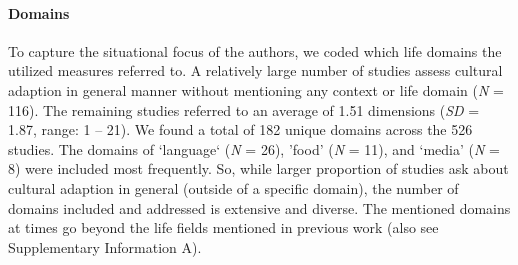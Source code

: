 \paragraph{Domains}

To capture the situational focus of the authors, we coded which life
domains the utilized measures referred to. A relatively large number of
studies assess cultural adaption in general manner without mentioning
any context or life domain (\textit{N} = 116). The remaining studies
referred to an average of 1.51 dimensions (\textit{SD} = 1.87, range: 1
-- 21). We found a total of 182 unique domains across the 526 studies.
The domains of `language` (\textit{N} = 26), 'food' (\textit{N} = 11),
and `media' (\textit{N} = 8) were included most frequently. So, while
larger proportion of studies ask about cultural adaption in general
(outside of a specific domain), the number of domains included and
addressed is extensive and diverse. The mentioned domains at times go
beyond the life fields mentioned in previous work (also see
Supplementary Information A).
